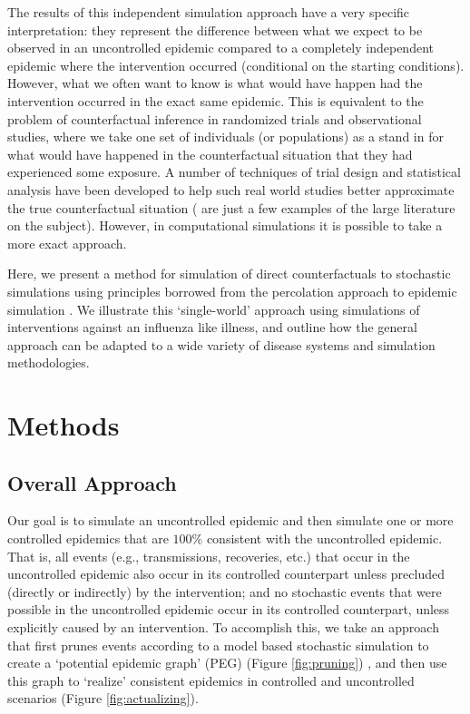 \documentclass[PTRSB]{rsos}
\begin{document}
\begin{multicols}{2}
The results of this independent simulation approach have a very specific interpretation: they represent the difference between what we expect to be observed in an uncontrolled epidemic compared to a completely independent epidemic where the intervention occurred (conditional on the starting conditions).
However, what we often want to know is what would have happen had the intervention occurred in the exact same epidemic.
This is equivalent to the problem of counterfactual inference in randomized trials and observational studies, where we take one set of individuals (or populations) as a stand in for what would have happened in the counterfactual situation that they had experienced some exposure.
A number of techniques of trial design and statistical analysis have been developed to help such real world studies better approximate the true counterfactual situation (\cite{hudgens-halloran:2008,murray-et-al:2017,buchanan:2014} are just a few examples of the large literature on the subject).
However, in computational simulations it is possible to take a more exact approach.

Here, we present a method for simulation of direct counterfactuals to stochastic simulations using principles borrowed from the percolation approach to epidemic simulation \cite{miller-book}.
We illustrate this `single-world' approach using simulations of interventions against an influenza like illness, and outline how the general approach can be adapted to a wide variety of disease systems and simulation methodologies.

\section{Methods}

\subsection*{Overall Approach}
Our goal is to simulate an uncontrolled epidemic and then simulate one or more controlled epidemics that are $100\%$ consistent with the uncontrolled epidemic.
That is, all events (e.g., transmissions, recoveries, etc.) that occur in the uncontrolled epidemic also occur in its controlled counterpart unless precluded (directly or indirectly) by the intervention; and no stochastic events that were possible in the uncontrolled epidemic occur in its controlled counterpart, unless explicitly caused by an intervention.
To accomplish this, we take an approach that first prunes events according to a model based stochastic simulation to create a `potential epidemic graph' (PEG) (Figure \ref{fig:pruning}) , and then use this graph to `realize' consistent epidemics in controlled and uncontrolled scenarios (Figure \ref{fig:actualizing}).


\end{multicols}
\end{document}

